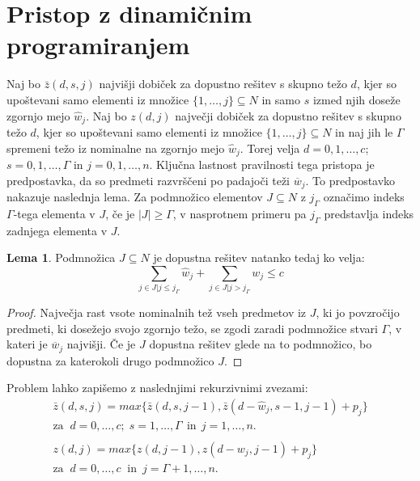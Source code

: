 \documentclass[a4paper,12pt]{article}
\theoremstyle{definition}
\newtheorem{definition}{Lema}
\begin{document}
\section{Pristop z dinamičnim programiranjem}   %
\medskip
Naj bo $ \bar{z}(d, s, j) $ najvišji dobiček za dopustno rešitev s skupno težo $d$, kjer so upoštevani 
samo elementi iz množice $\{1, \dots,j\} \subseteq N$ in samo $s$ izmed njih doseže zgornjo mejo $\hat{w}_j$. 
Naj bo $z(d, j)$ največji dobiček za dopustno rešitev s skupno težo $d$, kjer so upoštevani samo elementi 
iz množice $\{ 1,\dots,j \} \subseteq N $ in naj jih le $\Gamma $ spremeni težo iz nominalne na zgornjo mejo $\hat{w}_j$. 
Torej velja $d = 0, 1, \dots, c$; $s = 0, 1, \dots, \Gamma$ in $ j = 0, 1, \dots, n$.
Ključna lastnost pravilnosti tega pristopa je predpostavka, da so predmeti razvrščeni po padajoči teži $\overline{w}_j$. 
To predpostavko nakazuje naslednja lema. Za podmnožico elementov
 $J \subseteq N$ z $j_\Gamma$ označimo indeks $\Gamma$-tega elementa v $J$, če
 je $|J| \geq \Gamma$, v nasprotnem primeru pa $j_\Gamma$ predstavlja indeks 
 zadnjega elementa v $J$. 
\begin{definition}\label{lema1}
Podmnožica $J \subseteq N$ je dopustna rešitev natanko tedaj ko velja:
\begin{equation}
    \tag*{}
        \sum_{j \in J|j \leq j_\Gamma} \hat{w}_j + \sum_{j \in J|j > j_\Gamma}w_j \leq c
\end{equation}
\end{definition}
\begin{proof}
    Največja rast vsote nominalnih tež vseh predmetov iz $J$, ki jo
    povzročijo predmeti, ki dosežejo svojo zgornjo težo, se zgodi zaradi 
    podmnožice stvari $\Gamma$, v kateri je $\overline{w}_j$ najvišji. Če je
    $J$ dopustna rešitev glede na to podmnožico, bo dopustna za katerokoli drugo
    podmnožico $J$.
\end{proof}
Problem lahko zapišemo z naslednjimi rekurzivnimi zvezami: 
\begin{equation}  
    \tag*{}
    \begin{matrix}
    \bar{z}(d, s, j) = max\{ \bar{z}(d, s, j - 1), \bar{z}(d - \hat{w}_j, s- 1, j - 1) + p_j\} \\
    \text{za} \; \; d = 0,\dots, c; \; s = 1,\dots, \Gamma \:\: \text{in} \:\:j = 1,\dots, n. \\ 
    \\
    z(d, j) = max\{z(d, j - 1), z (d - w_j, j - 1) + p_j\} \\
    \text{za} \; \; d = 0,\dots, c\;\;\text{in}\;\: j = \Gamma + 1,\dots, n.
    \end{matrix}
\end{equation} 
\end{document}
